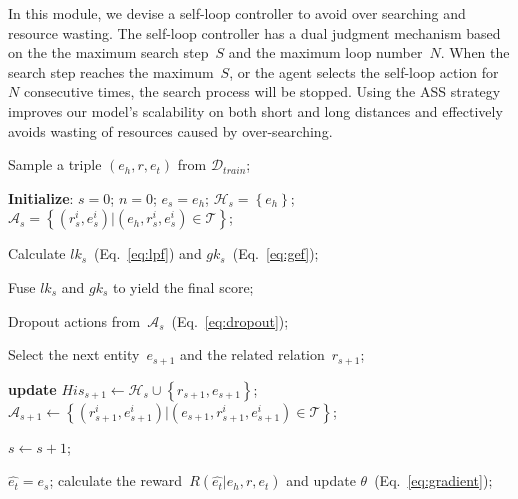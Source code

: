 In this module, we devise a self-loop controller to avoid over searching and resource wasting.
The self-loop controller has a dual judgment mechanism based on the the maximum search step~$S$ and the maximum loop number~$N$.
When the search step reaches the maximum~$S$, or the agent selects the self-loop action for $N$ consecutive times, the search process will be stopped.
Using the ASS strategy improves our model's scalability on both short and long distances and effectively avoids wasting of resources caused by over-searching.

\begin{algorithm}[t]
        \footnotesize
        \caption{Training process of GMH}
        \label{algorithm:training}
        \LinesNumbered

      {
        Sample a triple $(e_{h},r,e_{t})$ from $\mathcal{D}_{train}$;
      
      \textbf{Initialize}: $s=0$; $n=0$;
      $e_{s}=e_{h}$; $\mathcal{H}_{s}=\left \{e_{h}\right \}$; $\mathcal{A}_{s}=\left \{ ({{r_{s}^{i}}},{{e_{s}^{i}}} )|({e}_{h},{{r_{s}^{i}}},{{e_{s}^{i}}} )\in \mathcal{T}\right \}$; 
      
      {
        Calculate $lk_{s}$~(Eq.~\ref{eq:lpf}) and $gk_{s}$~(Eq.~\ref{eq:gef});

        Fuse $lk_{s}$ and $gk_{s}$ to yield the final score;

        Dropout actions from~$\mathcal{A}_{s}$~(Eq.~\ref{eq:dropout});
         

        Select the next entity~$e_{s+1}$ and the related relation~$r_{s+1}$;
        
                
        \textbf{update} $His_{s+1}\leftarrow \mathcal{H}_{s}\cup \left \{r_{s+1},e_{s+1}\right \}$; $\mathcal{A}_{s+1}\leftarrow \left \{ ({{r_{s+1}^{i}}},{{e_{s+1}^{i}}} )|({e}_{s+1},{{r_{s+1}^{i}}},{{e_{s+1}^{i}}} )\in \mathcal{T}\right \}$;
        
        $s\leftarrow s+1$;
      }
      $\hat{e_{t}}=e_{s}$; calculate the reward~$R(\hat{e_{t}}|e_{h},r,e_{t})$ and update $\theta$~(Eq.~\ref{eq:gradient});
      }
\end{algorithm}

